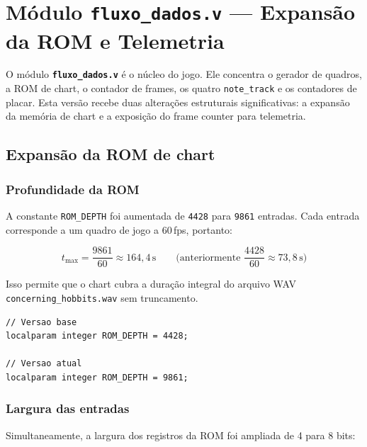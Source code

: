 \documentclass[12pt, a4paper]{article}
\newcommand{\antes}[1]{\textcolor{oldcolor}{\texttt{#1}}}
\newcommand{\depois}[1]{\textcolor{newcolor}{\texttt{#1}}}
\newcommand{\vfile}[1]{\texttt{\textbf{#1}}}
\newcommand{\vsig}[1]{\texttt{#1}}
\begin{document}
\section{Módulo \texttt{fluxo\_dados.v} — Expansão da ROM e Telemetria}

O módulo \vfile{fluxo\_dados.v} é o núcleo do jogo. Ele concentra o gerador
de quadros, a ROM de chart, o contador de frames, os quatro \texttt{note\_track}
e os contadores de placar. Esta versão recebe duas alterações estruturais
significativas: a expansão da memória de chart e a exposição do frame counter
para telemetria.

\subsection{Expansão da ROM de chart}

\subsubsection{Profundidade da ROM}

A constante \vsig{ROM\_DEPTH} foi aumentada de \antes{4428} para \depois{9861}
entradas. Cada entrada corresponde a um quadro de jogo a 60\,fps, portanto:

\begin{equation}
    t_{\max} = \frac{9861}{60} \approx 164{,}4\,\text{s}
    \qquad \text{(anteriormente } \frac{4428}{60} \approx 73{,}8\,\text{s)}
\end{equation}

Isso permite que o chart cubra a duração integral do arquivo WAV
\texttt{concerning\_hobbits.wav} sem truncamento.

\begin{lstlisting}[caption={Parâmetro ROM\_DEPTH — antes e depois}]
// Versao base
localparam integer ROM_DEPTH = 4428;

// Versao atual
localparam integer ROM_DEPTH = 9861;
\end{lstlisting}

\subsubsection{Largura das entradas}

Simultaneamente, a largura dos registros da ROM foi ampliada de 4 para 8 bits:
\end{document}
